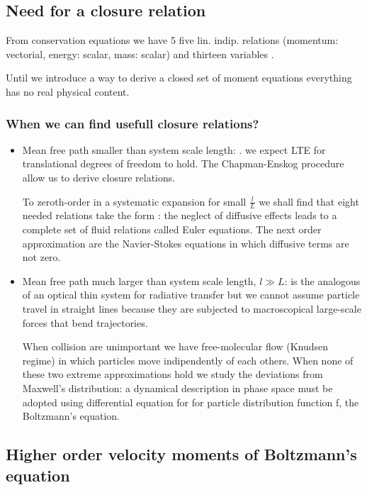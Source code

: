 \subsection{Need for a closure relation}

From conservation equations we have 5 five lin. indip. relations (momentum: vectorial, energy: scalar, mass: scalar) and thirteen variables .

Until we introduce a way to derive a closed set of moment equations everything has no real physical content.

\subsubsection{When we can find usefull closure relations?}

\begin{itemize}
\item Mean free path smaller than system scale length: . we expect LTE for translational degrees of freedom to hold. The Chapman-Enskog procedure allow us to derive closure relations.

To zeroth-order in a systematic expansion for small $\frac{l}{L}$ we shall find that eight needed relations take the form : the neglect of diffusive effects leads to a complete set of fluid relations called Euler equations. The next order approximation are the Navier-Stokes equations in which diffusive terms  are not zero.

\item Mean free path much larger than system scale length, $l\gg L$: is the analogous of an optical thin system for radiative transfer but we cannot assume particle travel in straight lines because they are subjected to macroscopical large-scale forces that bend trajectories.

When collision are unimportant we have free-molecular flow (Knudsen regime) in which particles move indipendently of each others. When none of these two extreme approximations hold we study the deviations from Maxwell's distribution: a dynamical description in phase space must be adopted using differential equation for for particle distribution function f, the Boltzmann's equation.

\end{itemize}

\subsection{Higher order velocity moments of Boltzmann's equation}

